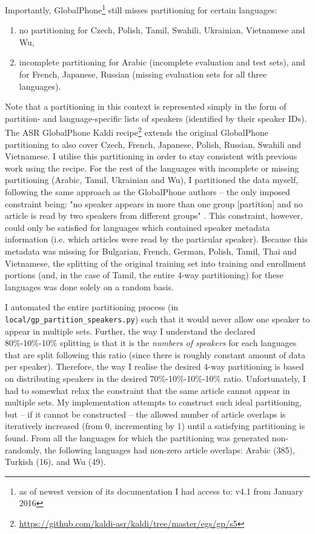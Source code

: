 \documentclass[bsc,frontabs,twoside,singlespacing,parskip,deptreport]{infthesis}
\begin{document}
{{    Importantly, GlobalPhone\footnote{as of newest version of its documentation I had access to: v4.1 from January 2016} still misses partitioning for certain languages:
    \begin{enumerate}
      \item {no partitioning for Czech, Polish, Tamil, Swahili, Ukrainian, Vietnamese and Wu,}
      \item {incomplete partitioning for Arabic (incomplete evaluation and test sets), and for French, Japanese, Russian (missing evaluation sets for all three languages).}
    \end{enumerate}
    Note that a partitioning in this context is represented simply in the form of partition- and language-specific lists of speakers (identified by their speaker IDs).
    The ASR GlobalPhone Kaldi recipe\footnote{\url{https://github.com/kaldi-asr/kaldi/tree/master/egs/gp/s5}} extends the original GlobalPhone partitioning to also cover Czech, French, Japanese, Polish, Russian, Swahili and Vietnamese. I utilise this partitioning in order to stay consistent with previous work using the recipe. For the rest of the languages with incomplete or missing partitioning (Arabic, Tamil, Ukrainian and Wu), I partitioned the data myself, following the same approach as the GlobalPhone authors -- the only imposed constraint being: "no speaker appears in more than one group [partition] and no article is read by two speakers from different groups" \citep[p. 348]{Schultz_2002}. This constraint, however, could only be satisfied for languages which contained speaker metadata information (i.e. which articles were read by the particular speaker). Because this metadata was missing for Bulgarian, French, German, Polish, Tamil, Thai and Vietnamese, the splitting of the original training set into training and enrollment portions (and, in the case of Tamil, the entire 4-way partitioning) for these languages was done solely on a random basis.

    I automated the entire partitioning process (in \verb|local/gp_partition_speakers.py|) such that it would never allow one speaker to appear in multiple sets. Further, the way I understand the declared 80\%-10\%-10\% splitting is that it is the \textit{numbers of speakers} for each languages that are split following this ratio (since there is roughly constant amount of data per speaker). Therefore, the way I realise the desired 4-way partitioning is based on distributing speakers in the desired 70\%-10\%-10\%-10\% ratio. Unfortunately, I had to somewhat relax the constraint that the same article cannot appear in multiple sets. My implementation attempts to construct such ideal partitioning, but -- if it cannot be constructed -- the allowed number of article overlaps is iteratively increased (from 0, incrementing by 1) until a satisfying partitioning is found.
    From all the languages for which the partitioning was generated non-randomly, the following languages had non-zero article overlaps: Arabic (385), Turkish (16), and Wu (49).

}}
\end{document}
